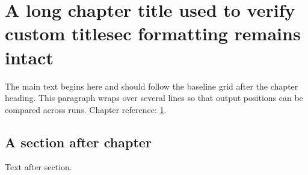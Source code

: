 \documentclass{report}
\begin{document}
\chapter{A long chapter title used to verify custom titlesec formatting remains intact}
\label{ch:custom}
The main text begins here and should follow the baseline grid after the chapter heading. This paragraph wraps over several lines so that output positions can be compared across runs. Chapter reference: \ref{ch:custom}.
\section{A section after chapter}
Text after section.
\end{document}
